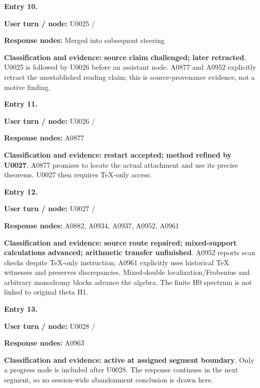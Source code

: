 \documentclass[10pt,a4paper,oneside]{report}
\begin{document}

\textbf{Entry 10.}

\textbf{User turn / node:} U0025 /
\protect{}

\textbf{Response nodes:} Merged into subsequent steering

\textbf{Classification and evidence:} \textbf{source claim challenged;
later retracted}. U0025 is followed by U0026 before an assistant node.
A0877 and A0952 explicitly retract the unestablished reading claim; this
is source-provenance evidence, not a motive finding.


\textbf{Entry 11.}

\textbf{User turn / node:} U0026 /
\protect{}

\textbf{Response nodes:} A0877

\textbf{Classification and evidence:} \textbf{restart accepted; method
refined by U0027}. A0877 promises to locate the actual attachment and
use its precise theorems. U0027 then requires TeX-only access.


\textbf{Entry 12.}

\textbf{User turn / node:} U0027 /
\protect{}

\textbf{Response nodes:} A0882, A0934, A0937, A0952, A0961

\textbf{Classification and evidence:} \textbf{source route repaired;
mixed-support calculations advanced; arithmetic transfer unfinished}.
A0952 reports scan checks despite TeX-only instruction; A0961 explicitly
uses historical TeX witnesses and preserves discrepancies. Mixed-double
localization/Frobenius and arbitrary monodromy blocks advance the
algebra. The finite H0 spectrum is not linked to original theta H1.


\textbf{Entry 13.}

\textbf{User turn / node:} U0028 /
\protect{}

\textbf{Response nodes:} A0963

\textbf{Classification and evidence:} \textbf{active at assigned segment
boundary}. Only a progress node is included after U0028. The response
continues in the next segment, so no session-wide abandonment conclusion
is drawn here.
\end{document}
